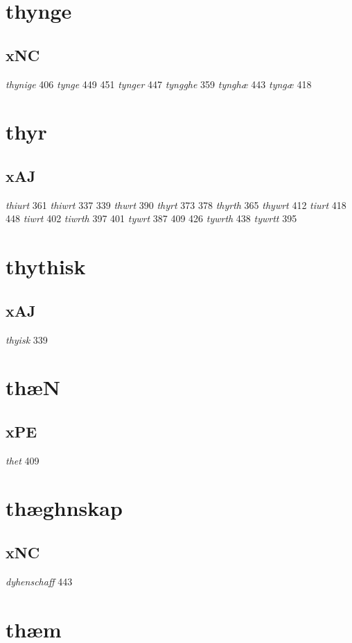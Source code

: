 \documentclass[a4paper,twocolumn]{article}
\begin{document}
\section{thynge}
\label{sec:org847f154}
\subsection{xNC}
\label{sec:org3b3449f}
\emph{thynige} 406 \emph{tynge} 449 451 \emph{tynger} 447 \emph{tyngghe} 359 \emph{tynghæ} 443 \emph{tyngæ} 418 
\section{thyr}
\label{sec:orge9c818b}
\subsection{xAJ}
\label{sec:org4c60079}
\emph{thiurt} 361 \emph{thiwrt} 337 339 \emph{thwrt} 390 \emph{thyrt} 373 378 \emph{thyrth} 365 \emph{thywrt} 412 \emph{tiurt} 418 448 \emph{tiwrt} 402 \emph{tiwrth} 397 401 \emph{tywrt} 387 409 426 \emph{tywrth} 438 \emph{tywrtt} 395 
\section{thythisk}
\label{sec:org8dfd189}
\subsection{xAJ}
\label{sec:org45dfb07}
\emph{thyisk} 339 
\section{thæN}
\label{sec:org2b758d4}
\subsection{xPE}
\label{sec:orgfee2af4}
\emph{thet} 409 
\section{thæghnskap}
\label{sec:orga4ae467}
\subsection{xNC}
\label{sec:orged7bbff}
\emph{dyhenschaff} 443 
\section{thæm}
\label{sec:org536f9a2}
\end{document}
